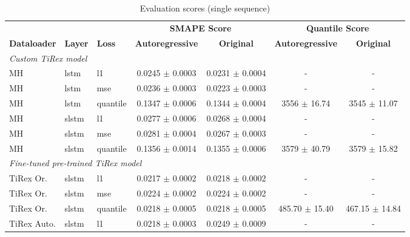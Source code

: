\documentclass[a4paper,oneside,10pt,ngerman,english]{scrartcl}
\begin{document}
\begin{table}[htbp]
	\centering
	\begin{threeparttable}
		\caption{Evaluation scores (single sequence)}
		\label{tab:scores_custom_tirex_single}
		\setlength{\tabcolsep}{3pt}
		\begin{tabular}{lllcccc}
			\toprule
			& & & \multicolumn{2}{c}{\textbf{SMAPE Score}} & \multicolumn{2}{c}{\textbf{Quantile Score}} \\
			\cmidrule(lr){4-5} \cmidrule(lr){6-7}
			\textbf{Dataloader} & \textbf{Layer} & \textbf{Loss} & \textbf{Autoregressive} & \textbf{Original} & \textbf{Autoregressive} & \textbf{Original} \\
			\midrule
			\multicolumn{7}{l}{{\small \emph{Custom TiRex model}}}\\
			MH & lstm & l1       & 0.0245 $\pm$ 0.0003 & \cellcolor[HTML]{fdfebc}0.0231 $\pm$ 0.0004 & - & - \\
			MH & lstm & mse      & 0.0236 $\pm$ 0.0003 & \cellcolor[HTML]{fdfebc}0.0223 $\pm$ 0.0003 & -  & -  \\
			MH & lstm & quantile & 0.1347 $\pm$ 0.0006 & \cellcolor[HTML]{fdfebc}0.1344 $\pm$ 0.0004 & 3556 $\pm$ 16.74 & 3545 $\pm$ 11.07 \\
			\addlinespace
			MH & slstm & l1      & 0.0277 $\pm$ 0.0006 & \cellcolor[HTML]{fdfebc}0.0268 $\pm$ 0.0004 & - & - \\
			MH & slstm & mse     & 0.0281 $\pm$ 0.0004 & \cellcolor[HTML]{fdfebc}0.0267 $\pm$ 0.0003 & - & - \\
			MH & slstm & quantile & 0.1356 $\pm$ 0.0014 & \cellcolor[HTML]{fdfebc}0.1355 $\pm$ 0.0006 & 3579 $\pm$ 40.79 & 3579 $\pm$ 15.82 \\
			\midrule
			\multicolumn{7}{l}{{\small \emph{Fine-tuned pre-trained TiRex model}}}\\
			TiRex Or. & slstm & l1       & \cellcolor[HTML]{006837}\color[HTML]{f1f1f1}0.0217 $\pm$ 0.0002 & 0.0218 $\pm$ 0.0002 & - & - \\
			TiRex Or. & slstm & mse      & \cellcolor[HTML]{fdfebc}0.0224 $\pm$ 0.0002 & \cellcolor[HTML]{fdfebc}0.0224 $\pm$ 0.0002	 & -  & -  \\
			TiRex Or. & slstm & quantile & \cellcolor[HTML]{fdfebc}0.0218 $\pm$ 0.0005 & \cellcolor[HTML]{fdfebc}0.0218 $\pm$ 0.0005 & 485.70 $\pm$ 15.40 & \cellcolor[HTML]{006837}\color[HTML]{f1f1f1}467.15 $\pm$ 14.84 \\
			\addlinespace
			TiRex Auto. & slstm & l1      & \cellcolor[HTML]{fdfebc}0.0218 $\pm$ 0.0003 & 0.0249 $\pm$ 0.0009 & - & - \\

\end{tabular}
\end{threeparttable}
\end{table}
\end{document}
